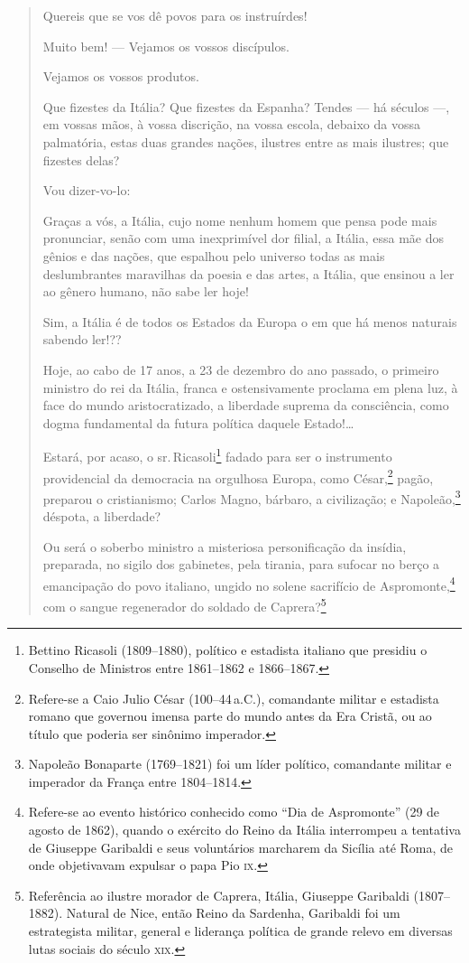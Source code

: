 \begin{quote}
Quereis que se vos dê povos para os instruírdes!

Muito bem! --- Vejamos os vossos discípulos.

Vejamos os vossos produtos.

Que fizestes da Itália? Que fizestes da Espanha? Tendes --- há séculos ---,
em vossas mãos, à vossa discrição, na vossa escola, debaixo da vossa
palmatória, estas duas grandes nações, ilustres entre as mais ilustres;
que fizestes delas?

Vou dizer-vo-lo:

Graças a vós, a Itália, cujo nome nenhum homem que pensa pode mais
pronunciar, senão com uma inexprimível dor filial, a Itália, essa mãe
dos gênios e das nações, que espalhou pelo universo todas as mais
deslumbrantes maravilhas da poesia e das artes, a Itália, que ensinou a
ler ao gênero humano, não sabe ler hoje!

Sim, a Itália é de todos os Estados da Europa o em que há menos naturais
sabendo ler!??

Hoje, ao cabo de 17 anos, a 23 de dezembro do ano passado, o primeiro
ministro do rei da Itália, franca e ostensivamente proclama em plena
luz, à face do mundo aristocratizado, a liberdade suprema da
consciência, como dogma fundamental da futura política daquele
Estado!\ldots{}

Estará, por acaso, o sr.\,Ricasoli\footnote{Bettino Ricasoli
  (1809--1880), político e estadista italiano que presidiu o Conselho de
  Ministros entre 1861--1862 e 1866--1867.} fadado para ser o instrumento
providencial da democracia na orgulhosa Europa, como César,\footnote{
  Refere-se a Caio Julio César (100--44\,a.C.), comandante militar e
  estadista romano que governou imensa parte do mundo antes da Era
  Cristã, ou ao título que poderia ser sinônimo imperador.} pagão,
preparou o cristianismo; Carlos Magno, bárbaro, a civilização; e
Napoleão,\footnote{Napoleão Bonaparte (1769--1821) foi um líder
  político, comandante militar e imperador da França entre 1804--1814.\label{napoleao}}
déspota, a liberdade?

Ou será o soberbo ministro a misteriosa personificação da insídia,
preparada, no sigilo dos gabinetes, pela tirania, para sufocar no berço
a emancipação do povo italiano, ungido no solene sacrifício de
Aspromonte,\footnote{Refere-se ao evento histórico conhecido como ``Dia
  de Aspromonte'' (29 de agosto de 1862), quando o exército do Reino da Itália
  interrompeu a tentativa de Giuseppe Garibaldi e seus voluntários
  marcharem da Sicília até Roma, de onde objetivavam expulsar o papa Pio
  \textsc{ix}.} com o sangue regenerador do soldado de Caprera?\footnote{
  Referência ao ilustre morador de Caprera, Itália, Giuseppe Garibaldi
  (1807--1882). Natural de Nice, então Reino da Sardenha, Garibaldi foi
  um estrategista militar, general e liderança política de grande relevo
  em diversas lutas sociais do século \textsc{xix}.}


\end{quote}
